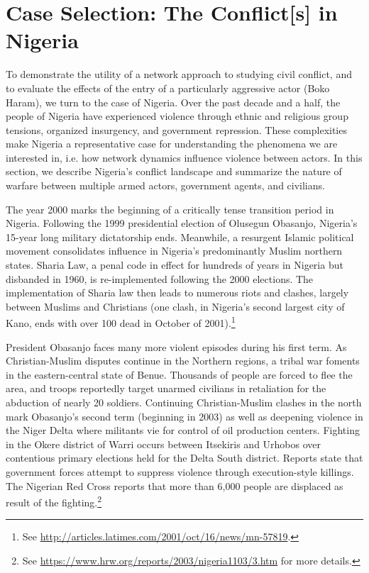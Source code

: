 \section*{Case Selection: The Conflict[s] in Nigeria}

To demonstrate the utility of a network approach to studying civil conflict, and to evaluate the effects of the entry of a particularly aggressive actor (Boko Haram), we turn to the case of Nigeria. Over the past decade and a half, the people of Nigeria have experienced violence through ethnic and religious group tensions, organized insurgency, and government repression. These complexities make Nigeria a representative case for understanding the phenomena we are interested in, i.e. how network dynamics influence violence between actors. In this section, we describe Nigeria's conflict landscape and summarize the nature of warfare between multiple armed actors, government agents, and civilians. 

The year 2000 marks the beginning of a critically tense transition period in Nigeria. Following the 1999 presidential election of Olusegun Obasanjo, Nigeria's 15-year long military dictatorship ends. Meanwhile, a resurgent Islamic political movement consolidates influence in Nigeria's predominantly Muslim northern states. Sharia Law, a penal code in effect for hundreds of years in Nigeria but disbanded in 1960, is re-implemented following the 2000 elections. The implementation of Sharia law then leads to numerous riots and clashes, largely between Muslims and Christians (one clash, in Nigeria's second largest city of Kano, ends with over 100 dead in October of 2001).\footnote{See \url{http://articles.latimes.com/2001/oct/16/news/mn-57819}.}

President Obasanjo faces many more violent episodes during his first term. As Christian-Muslim disputes continue in the Northern regions, a tribal war foments in the eastern-central state of Benue. Thousands of people are forced to flee the area, and troops reportedly target unarmed civilians in retaliation for the abduction of nearly 20 soldiers. Continuing Christian-Muslim clashes in the north mark Obasanjo's second term (beginning in 2003) as well as deepening violence in the Niger Delta where militants vie for control of oil production centers. Fighting in the Okere district of Warri occurs between Itsekiris and Urhobos over contentious primary elections held for the Delta South district. Reports state that government forces attempt to suppress violence through execution-style killings. The Nigerian Red Cross reports that more than 6,000 people are displaced as result of the fighting.\footnote{See \url{https://www.hrw.org/reports/2003/nigeria1103/3.htm} for more details.}

